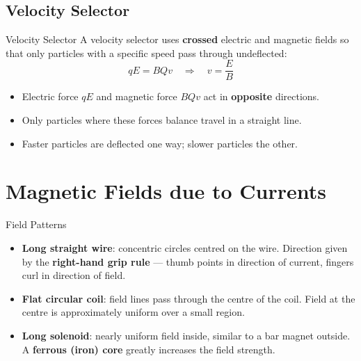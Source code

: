 \subsection{Velocity Selector}

\begin{keybox}{Velocity Selector}
A velocity selector uses \textbf{crossed} electric and magnetic fields so that only particles with a specific speed pass through undeflected:
$$qE = BQv \quad \Rightarrow \quad v = \frac{E}{B}$$
\begin{itemize}[itemsep=2pt]
  \item Electric force $qE$ and magnetic force $BQv$ act in \textbf{opposite} directions.
  \item Only particles where these forces balance travel in a straight line.
  \item Faster particles are deflected one way; slower particles the other.
\end{itemize}
\end{keybox}

\section{Magnetic Fields due to Currents}

\begin{keybox}{Field Patterns}
\begin{itemize}[itemsep=3pt]
  \item \textbf{Long straight wire}: concentric circles centred on the wire. Direction given by the \textbf{right-hand grip rule} — thumb points in direction of current, fingers curl in direction of field.
  \item \textbf{Flat circular coil}: field lines pass through the centre of the coil. Field at the centre is approximately uniform over a small region.
  \item \textbf{Long solenoid}: nearly uniform field inside, similar to a bar magnet outside. A \textbf{ferrous (iron) core} greatly increases the field strength.
\end{itemize}
\end{keybox}

